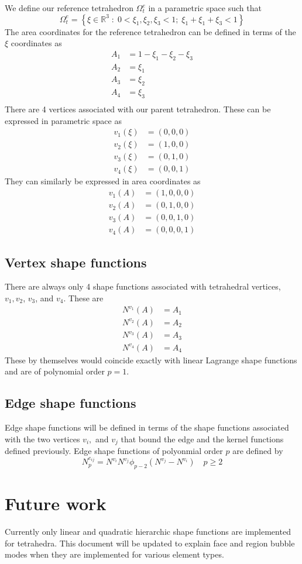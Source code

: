 \documentclass{article}
\begin{document}
We define our reference tetrahedron $\Omega^e_t$ in a parametric space
such that
\[
\Omega^e_t = \left\{ \xi \in \mathbb{R}^3 \; : \;
0 < \xi_1, \xi_2, \xi_3 < 1; \; \xi_1 + \xi_1 + \xi_3 < 1 \right\}
\]
The area coordinates for the reference tetrahedron can be defined in terms of
the $\xi$ coordinates as
\begin{align*}
A_1 &= 1 - \xi_1 - \xi_2 - \xi_3 \\
A_2 &= \xi_1 \\
A_3 &= \xi_2 \\
A_4 &= \xi_3 \\
\end{align*}
There are 4 vertices associated with our parent tetrahedron. These can be
expressed in parametric space as
\begin{align*}
v_1(\xi) &= (0,0,0) \\
v_2(\xi) &= (1,0,0) \\
v_3(\xi) &= (0,1,0) \\
v_4(\xi) &= (0,0,1)
\end{align*}
They can similarly be expressed in area coordinates as
\begin{align*}
v_1(A) &= (1,0,0,0) \\
v_2(A) &= (0,1,0,0) \\
v_3(A) &= (0,0,1,0) \\
v_4(A) &= (0,0,0,1)
\end{align*}

\subsection{Vertex shape functions}

There are always only 4 shape functions associated with tetrahedral vertices, 
$v_1, v_2$, $v_3$, and $v_4$.
These are
\begin{align*}
N^{v_1}(A) &= A_1 \\
N^{v_2}(A) &= A_2 \\
N^{v_3}(A) &= A_3 \\
N^{v_4}(A) &= A_4
\end{align*}
These by themselves would coincide exactly with linear Lagrange shape
functions and are of polynomial order $p=1$.

\subsection{Edge shape functions}
Edge shape functions will be defined in terms of the shape functions
associated with the two vertices $v_i,$ and $v_j$ that bound the edge and the
kernel functions defined previously. Edge shape functions of polyonmial order
$p$ are defined by
\[
N^{e_{ij}}_p = N^{v_i} N^{v_j} \phi_{p-2}(N^{v_j} - N^{v_i})
\quad p \geq 2
\]

\section{Future work}
Currently only linear and quadratic hierarchic shape functions are
implemented for tetrahedra. This document will be updated to explain face
and region bubble modes when they are implemented for various element types.
\end{document}
